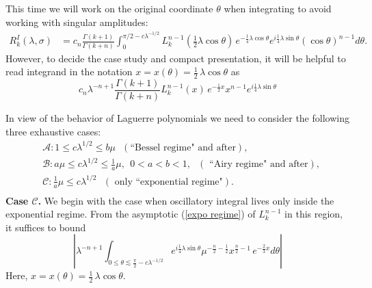 \documentclass[11pt, reqno]{amsart}
\theoremstyle{plain}
\theoremstyle{remark}
\theoremstyle{example}
\theoremstyle{definition}
\numberwithin{equation}{section}
\begin{document}
This time we will work on the original coordinate $\theta$ when integrating to avoid working with singular amplitudes:
\begin{equation}\label{Recall 1 II Coeff. Rk as Laguerre integral}
   \begin{split}
        R_{k}^{I}(\lambda, \sigma) 
        & = c_{n} \frac{\Gamma(k+1)}{\Gamma(k+n)}    \int_{0}^{  \pi/2 - c \lambda^{-1/2} } L_{k}^{n-1} \left( {\textstyle\frac{1}{2} } \lambda  \cos{\theta}  \right) \, e^{ - \frac{1}{4} \lambda \cos{\theta}}  e^{i \frac{1}{4} \lambda \sin{\theta}} (\cos{\theta})^{n-1} d \theta.
   \end{split}
\end{equation}
However, to decide the case study and compact presentation, it will be helpful to read integrand in the notation $x=x(\theta)= \frac{1}{2} \, \lambda \cos{\theta}$  as
\begin{equation*}
   c_{n} \lambda^{-n+1} \frac{\Gamma(k+1)}{\Gamma(k+n)} L_{k}^{n-1}(x) \, e^{-\frac{1}{2} x }  x^{n-1} e^{i \frac{1}{4} \lambda \sin{\theta}}
\end{equation*}

In view of the behavior of Laguerre polynomials we need to consider the following three exhaustive cases:
\begin{equation*}
    \begin{split}
        &  \mathcal{A} : 1 \leq  c \lambda^{1/2}  \leq b \mu  \ \ \ (\text{``Bessel regime" and after} ), \\
        & \mathcal{B}: a \mu  \leq c \lambda^{1/2} \leq {\textstyle\frac{1}{a} } \mu, \ \ 0<a <b<1,  \ \ \ (\text{ ``Airy regime" and after}),\\
        & \mathcal{C}: {\textstyle\frac{1}{a} } \mu \leq  c \lambda^{1/2}  \ \ \  (\text{ only  ``exponential regime"}).\\
    \end{split}
\end{equation*}
\noindent \textbf{Case $\mathcal{C}$.} We begin with the case when oscillatory integral lives only  inside the exponential regime. From the asymptotic (\ref{expo regime}) of $L_{k}^{n-1}$ in this region, it suffices to bound 
\begin{equation*}
   \left| \lambda^{-n+1}  \int_{0 \leq \theta \lesssim \frac{\pi}{2} - c \lambda^{-1/2}} e^{i \frac{1}{4} \lambda \sin{\theta}}  \mu^{-\frac{n}{2} - \frac{1}{2}} x^{\frac{n}{2} - 1} \,   e^{-\frac{2}{3} x }  d \theta \right|
\end{equation*}
Here, $x= x(\theta)=\frac{1}{2} \, \lambda \cos{\theta}$. 
\end{document}
